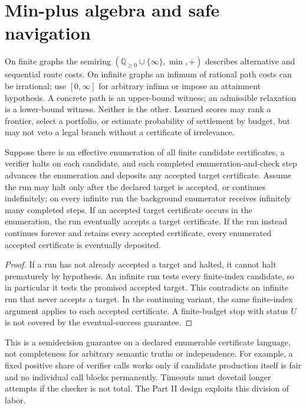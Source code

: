 \documentclass[11pt]{article}
\theoremstyle{definition}\newtheorem{definition}[theorem]{Definition}\newtheorem{example}[theorem]{Example}\newtheorem{conjecture}[theorem]{Conjecture}
\newcommand{\Q}{\mathbb Q}\newcommand{\N}{\mathbb N}\newcommand{\R}{\mathbb R}\newcommand{\E}{\mathbb E}\newcommand{\Prb}{\mathbb P}\newcommand{\Dep}{\operatorname{Dep}}\newcommand{\Ind}{\operatorname{Ind}}\newcommand{\Vfy}{\operatorname{Verify}}\newcommand{\supp}{\operatorname{supp}}\newcommand{\Fix}{\operatorname{Fix}}\newcommand{\eps}{\varepsilon}
\begin{document}
\section{Min-plus algebra and safe navigation}
On finite graphs the semiring $(\Q_{\ge0}\cup\{\infty\},\min,+)$ describes alternative and sequential route costs. On infinite graphs an infimum of rational path costs can be irrational; use $[0,\infty]$ for arbitrary infima or impose an attainment hypothesis. A concrete path is an upper-bound witness; an admissible relaxation is a lower-bound witness. Neither is the other. Learned scores may rank a frontier, select a portfolio, or estimate probability of settlement by budget, but may not veto a legal branch without a certificate of irrelevance.
\begin{proposition}
Suppose there is an effective enumeration of all finite candidate certificates, a verifier halts on each candidate, and each completed enumeration-and-check step advances the enumeration and deposits any accepted target certificate. Assume the run may halt only after the declared target is accepted, or continues indefinitely; on every infinite run the background enumerator receives infinitely many completed steps. If an accepted target certificate occurs in the enumeration, the run eventually accepts a target certificate. If the run instead continues forever and retains every accepted certificate, every enumerated accepted certificate is eventually deposited.
\end{proposition}
\begin{proof} If a run has not already accepted a target and halted, it cannot halt prematurely by hypothesis. An infinite run tests every finite-index candidate, so in particular it tests the promised accepted target. This contradicts an infinite run that never accepts a target. In the continuing variant, the same finite-index argument applies to each accepted certificate. A finite-budget stop with status $U$ is not covered by the eventual-success guarantee.\end{proof}
This is a semidecision guarantee on a declared enumerable certificate language, not completeness for arbitrary semantic truths or independence. For example, a fixed positive share of verifier calls works only if candidate production itself is fair and no individual call blocks permanently. Timeouts must dovetail longer attempts if the checker is not total. The Part II design exploits this division of labor.
\end{document}
